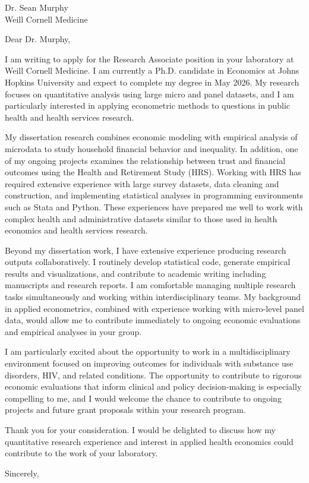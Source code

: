 \documentclass[11pt]{letter}
\begin{document}
\begin{letter}{Dr. Sean Murphy \\
Weill Cornell Medicine}

\opening{Dear Dr. Murphy,}

I am writing to apply for the Research Associate position in your laboratory at Weill Cornell Medicine. I am currently a Ph.D. candidate in Economics at Johns Hopkins University and expect to complete my degree in May 2026. My research focuses on quantitative analysis using large micro and panel datasets, and I am particularly interested in applying econometric methods to questions in public health and health services research.

My dissertation research combines economic modeling with empirical analysis of microdata to study household financial behavior and inequality. In addition, one of my ongoing projects examines the relationship between trust and financial outcomes using the Health and Retirement Study (HRS). Working with HRS has required extensive experience with large survey datasets, data cleaning and construction, and implementing statistical analyses in programming environments such as Stata and Python. These experiences have prepared me well to work with complex health and administrative datasets similar to those used in health economics and health services research.

Beyond my dissertation work, I have extensive experience producing research outputs collaboratively. I routinely develop statistical code, generate empirical results and visualizations, and contribute to academic writing including manuscripts and research reports. I am comfortable managing multiple research tasks simultaneously and working within interdisciplinary teams. My background in applied econometrics, combined with experience working with micro-level panel data, would allow me to contribute immediately to ongoing economic evaluations and empirical analyses in your group.

I am particularly excited about the opportunity to work in a multidisciplinary environment focused on improving outcomes for individuals with substance use disorders, HIV, and related conditions. The opportunity to contribute to rigorous economic evaluations that inform clinical and policy decision-making is especially compelling to me, and I would welcome the chance to contribute to ongoing projects and future grant proposals within your research program.

Thank you for your consideration. I would be delighted to discuss how my quantitative research experience and interest in applied health economics could contribute to the work of your laboratory.

\closing{Sincerely,}

\end{letter}
\end{document}
